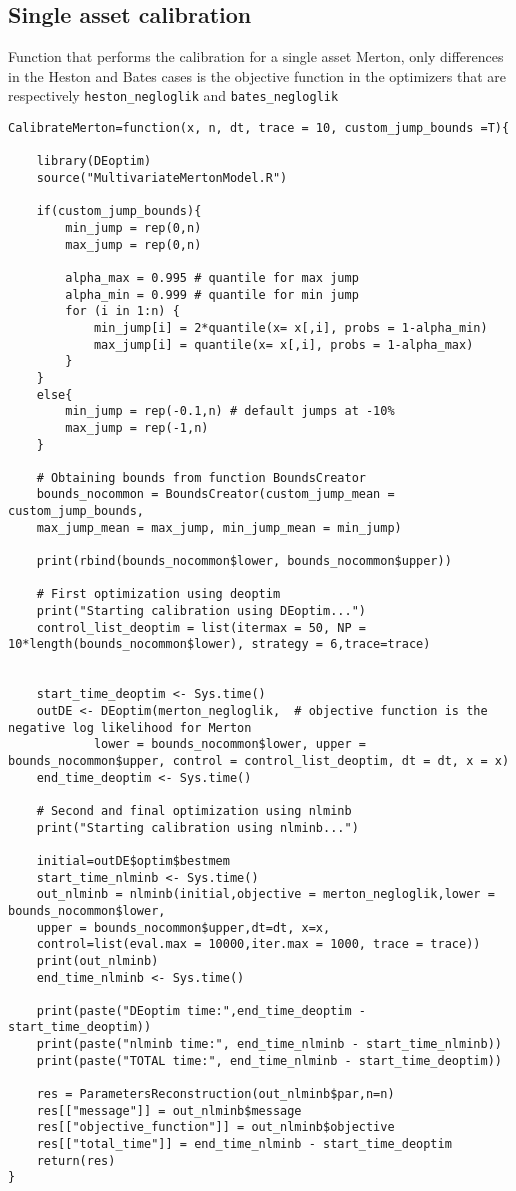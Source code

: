\subsection{Single asset calibration}
\bigskip
\noindent
Function that performs the calibration for a single asset Merton, only differences in the Heston and Bates cases is the objective function in the optimizers that are respectively  \texttt{heston\_negloglik} and \texttt{bates\_negloglik}
\begin{lstlisting}
CalibrateMerton=function(x, n, dt, trace = 10, custom_jump_bounds =T){
	
	library(DEoptim)
	source("MultivariateMertonModel.R")
	
	if(custom_jump_bounds){
		min_jump = rep(0,n)
		max_jump = rep(0,n)
		
		alpha_max = 0.995 # quantile for max jump
		alpha_min = 0.999 # quantile for min jump
		for (i in 1:n) {
			min_jump[i] = 2*quantile(x= x[,i], probs = 1-alpha_min)
			max_jump[i] = quantile(x= x[,i], probs = 1-alpha_max)
		}
	}
	else{
		min_jump = rep(-0.1,n) # default jumps at -10%
		max_jump = rep(-1,n)
	}
	
	# Obtaining bounds from function BoundsCreator
	bounds_nocommon = BoundsCreator(custom_jump_mean = custom_jump_bounds,
	max_jump_mean = max_jump, min_jump_mean = min_jump)
	
	print(rbind(bounds_nocommon$lower, bounds_nocommon$upper))
	
	# First optimization using deoptim
	print("Starting calibration using DEoptim...")
	control_list_deoptim = list(itermax = 50, NP = 10*length(bounds_nocommon$lower), strategy = 6,trace=trace)
	
	
	start_time_deoptim <- Sys.time()
	outDE <- DEoptim(merton_negloglik,  # objective function is the negative log likelihood for Merton
			lower = bounds_nocommon$lower, upper = bounds_nocommon$upper, control = control_list_deoptim, dt = dt, x = x)
	end_time_deoptim <- Sys.time()
	
	# Second and final optimization using nlminb
	print("Starting calibration using nlminb...")
	
	initial=outDE$optim$bestmem
	start_time_nlminb <- Sys.time()
	out_nlminb = nlminb(initial,objective = merton_negloglik,lower = bounds_nocommon$lower,
	upper = bounds_nocommon$upper,dt=dt, x=x,
	control=list(eval.max = 10000,iter.max = 1000, trace = trace))
	print(out_nlminb)
	end_time_nlminb <- Sys.time()
	
	print(paste("DEoptim time:",end_time_deoptim - start_time_deoptim))
	print(paste("nlminb time:", end_time_nlminb - start_time_nlminb))
	print(paste("TOTAL time:", end_time_nlminb - start_time_deoptim))
	
	res = ParametersReconstruction(out_nlminb$par,n=n)
	res[["message"]] = out_nlminb$message
	res[["objective_function"]] = out_nlminb$objective
	res[["total_time"]] = end_time_nlminb - start_time_deoptim
	return(res)
}
\end{lstlisting}


